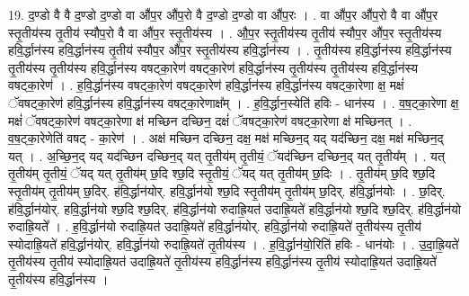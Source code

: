 \documentclass[17pt]{extarticle}
\begin{document}
19. द॒ण्डो वै वै द॒ण्डो द॒ण्डो वा औ॑प॒र औ॑प॒रो वै द॒ण्डो द॒ण्डो वा औ॑प॒रः । . वा औ॑प॒र औ॑प॒रो वै वा औ॑प॒र स्तृ॒तीय॑स्य तृ॒तीय॑ स्यौप॒रो वै वा औ॑प॒र स्तृ॒तीय॑स्य । . औ॒प॒र स्तृ॒तीय॑स्य तृ॒तीय॑ स्यौप॒र औ॑प॒र स्तृ॒तीय॑स्य हवि॒र्द्धान॑स्य हवि॒र्द्धान॑स्य तृ॒तीय॑ स्यौप॒र औ॑प॒र स्तृ॒तीय॑स्य हवि॒र्द्धान॑स्य । . तृ॒तीय॑स्य हवि॒र्द्धान॑स्य हवि॒र्द्धान॑स्य तृ॒तीय॑स्य तृ॒तीय॑स्य हवि॒र्द्धान॑स्य वषट्का॒रेण॑ वषट्का॒रेण॑ हवि॒र्द्धान॑स्य तृ॒तीय॑स्य तृ॒तीय॑स्य हवि॒र्द्धान॑स्य वषट्का॒रेण॑ । . ह॒वि॒र्द्धान॑स्य वषट्का॒रेण॑ वषट्का॒रेण॑ हवि॒र्द्धान॑स्य हवि॒र्द्धान॑स्य वषट्का॒रेणा
क्ष॒ मक्षं॑ ॅवषट्का॒रेण॑ हवि॒र्द्धान॑स्य हवि॒र्द्धान॑स्य वषट्का॒रेणाक्ष᳚म् । . ह॒वि॒र्द्धान॒स्येति॑ हविः - धान॑स्य । . व॒ष॒ट्का॒रेणा क्ष॒ मक्षं॑ ॅवषट्का॒रेण॑ वषट्का॒रेणा क्ष॑ मच्छिन दच्छिन॒ दक्षं॑ ॅवषट्का॒रेण॑ वषट्का॒रेणा क्ष॑ मच्छिनत् । . व॒ष॒ट्का॒रेणेति॑ वषट् - का॒रेण॑ । . अक्ष॑ मच्छिन दच्छिन॒ दक्ष॒ मक्ष॑ मच्छिन॒द् यद् यद॑च्छिन॒ दक्ष॒ मक्ष॑ मच्छिन॒द् यत् । . अ॒च्छि॒न॒द् यद् यद॑च्छिन दच्छिन॒द् यत् तृ॒तीय॑म् तृ॒तीयं॒ ॅयद॑च्छिन दच्छिन॒द् यत् तृ॒तीय᳚म् । . यत् तृ॒तीय॑म् तृ॒तीयं॒ ॅयद् यत् तृ॒तीय॑म् छ॒दि श्छ॒दि स्तृ॒तीयं॒ ॅयद् यत् तृ॒तीय॑म् छ॒दिः । . तृ॒तीय॑म् छ॒दि श्छ॒दि स्तृ॒तीय॑म् तृ॒तीय॑म् छ॒दिर्. ह॑वि॒र्द्धान॑योर्. हवि॒र्द्धान॑यो श्छ॒दि स्तृ॒तीय॑म् तृ॒तीय॑म् छ॒दिर्. ह॑वि॒र्द्धान॑योः । . छ॒दिर्. ह॑वि॒र्द्धान॑योर्. हवि॒र्द्धान॑यो श्छ॒दि श्छ॒दिर्. ह॑वि॒र्द्धान॑यो रुदाह्रि॒यत॑ उदाह्रि॒यते॑ हवि॒र्द्धान॑यो श्छ॒दि श्छ॒दिर्. ह॑वि॒र्द्धान॑यो रुदाह्रि॒यते᳚ । . ह॒वि॒र्द्धान॑यो रुदाह्रि॒यत॑ उदाह्रि॒यते॑ हवि॒र्द्धान॑योर्. हवि॒र्द्धान॑यो रुदाह्रि॒यते॑ तृ॒तीय॑स्य 
तृ॒तीय॑ स्योदाह्रि॒यते॑ हवि॒र्द्धान॑योर्. हवि॒र्द्धान॑यो रुदाह्रि॒यते॑ तृ॒तीय॑स्य । . ह॒वि॒र्द्धान॑यो॒रिति॑ हविः - धान॑योः । . उ॒दा॒ह्रि॒यते॑ तृ॒तीय॑स्य तृ॒तीय॑ स्योदाह्रि॒यत॑ उदाह्रि॒यते॑ तृ॒तीय॑स्य हवि॒र्द्धान॑स्य हवि॒र्द्धान॑स्य तृ॒तीय॑ स्योदाह्रि॒यत॑ उदाह्रि॒यते॑ तृ॒तीय॑स्य हवि॒र्द्धान॑स्य । \newline
\end{document}
